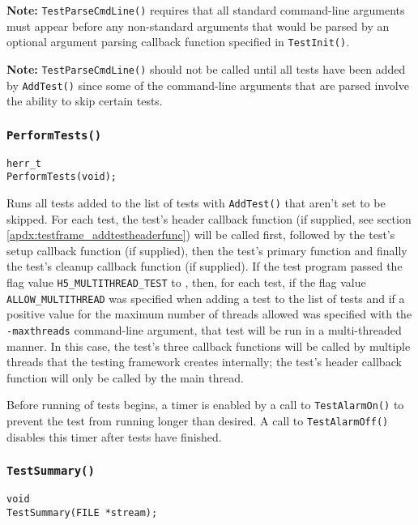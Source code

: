 \documentclass[../HDF5_RFC.tex]{subfiles}
\begin{document}
\textbf{Note:} \texttt{TestParseCmdLine()} requires that all standard command-line arguments must appear
before any non-standard arguments that would be parsed by an optional argument parsing callback function specified in \texttt{TestInit()}.

\textbf{Note:} \texttt{TestParseCmdLine()} should not be called until all tests have been added by
\texttt{AddTest()} since some of the command-line arguments that are parsed involve the ability to skip
certain tests.

\subsubsection{\texttt{PerformTests()}}
\label{apdx:testframe_performtests}

\begin{verbatim}
herr_t
PerformTests(void);
\end{verbatim}

Runs all tests added to the list of tests with \texttt{AddTest()} that aren't set to be skipped. For
each test, the test's header callback function (if supplied, see section
\ref{apdx:testframe_addtestheaderfunc}) will be called first, followed by the test's setup callback
function (if supplied), then the test's primary function and finally the test's cleanup callback
function (if supplied). If the test program passed the flag value \texttt{H5\_MULTITHREAD\_TEST} to
, then, for each test, if the flag value \texttt{ALLOW\_MULTITHREAD}
was specified when adding a test to the list of tests and if a positive value for the maximum number
of threads allowed was specified with the \texttt{-maxthreads} command-line argument, that test will
be run in a multi-threaded manner. In this case, the test's three callback functions will be called by multiple threads that the testing framework creates internally; the test's header callback function
will only be called by the main thread.

Before running of tests begins, a timer is enabled by a call to \texttt{TestAlarmOn()} to prevent the
test from running longer than desired. A call to \texttt{TestAlarmOff()} disables this timer after
tests have finished.

\subsubsection{\texttt{TestSummary()}}

\begin{verbatim}
void
TestSummary(FILE *stream);
\end{verbatim}
\end{document}
